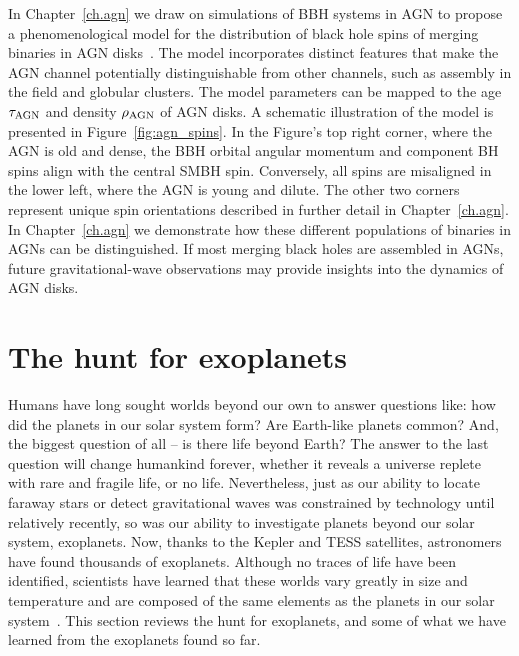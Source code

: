 In Chapter~\ref{ch.agn} we draw on simulations of BBH systems in AGN to propose a phenomenological model for the distribution of black hole spins of merging binaries in AGN disks~\cite{agn_migration_trap, agn_bbh_rates, agn_orbital_evol, agn_migration_1, agn_migration_2}. 
The model incorporates distinct features that make the AGN channel potentially distinguishable from other channels, such as assembly in the field and globular clusters. 
The model parameters can be mapped to the age $\tau_{\rm AGN}$ and density $\rho_{\rm AGN}$ of AGN disks. 
A schematic illustration of the model is presented in Figure~\ref{fig:agn_spins}. 
In the Figure's top right corner, where the AGN is old and dense, the BBH orbital angular momentum and component BH spins align with the central SMBH spin. 
Conversely, all spins are misaligned in the lower left, where the AGN is young and dilute. The other two corners represent unique spin orientations described in further detail in Chapter~\ref{ch.agn}.
In Chapter~\ref{ch.agn} we demonstrate how these different populations of binaries in AGNs can be distinguished.
If most merging black holes are assembled in AGNs, future gravitational-wave observations may provide insights into the dynamics of AGN disks.

\section{The hunt for exoplanets}

Humans have long sought worlds beyond our own to answer questions like: how did the planets in our solar system form? Are Earth-like planets common? And, the biggest question of all -- is there life beyond Earth? 
The answer to the last question will change humankind forever, whether it reveals a universe replete with rare and fragile life, or no life. 
Nevertheless, just as our ability to locate faraway stars or detect gravitational waves was constrained by technology until relatively recently, so was our ability to investigate planets beyond our solar system, exoplanets.
Now, thanks to the Kepler and TESS satellites, astronomers have found thousands of exoplanets.
Although no traces of life have been identified, scientists have learned that these worlds vary greatly in size and temperature and are composed of the same elements as the planets in our solar system~\cite{Traub:2012:ApJ, Morris:2017:ApJ, Yu:2017:ApJ}.
This section reviews the hunt for exoplanets, and some of what we have learned from the exoplanets found so far.

